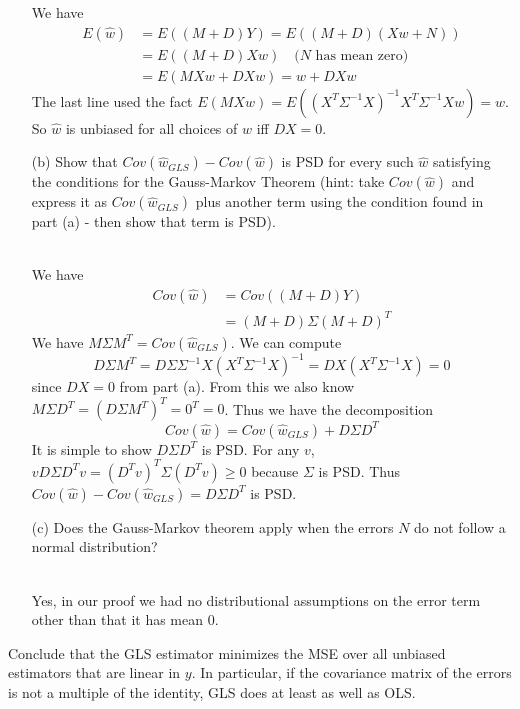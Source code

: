 \begin{Parts}
\begin{itemize}
	\begin{solution}
	We have 
	\begin{align*}
		E(\hat{w})&=E((M+D)Y)=E((M+D)(Xw+N))\\
		&=E((M+D)Xw)\quad\text{($N$ has mean zero)}\\
		&=E(MXw+DXw)=w+DXw
	\end{align*}
	The last line used the fact $E(MXw)=E((X^T\Sigma^{-1}X)^{-1}X^T\Sigma^{-1}Xw)=w$. So $\hat{w}$ is unbiased for all choices of $w$ iff $DX=0$.
	\end{solution}
	\item[(b)] Show that $Cov(\hat{w}_{GLS})-Cov(\hat{w})$ is PSD for every such $\hat{w}$ satisfying the conditions for the Gauss-Markov Theorem (hint: take $Cov(\hat{w})$ and express it as $Cov(\hat{w}_{GLS})$ plus another term using the condition found in part (a) - then show that term is PSD).\\
	\\
	\begin{solution}
	We have
	\begin{align*}
		Cov(\hat{w})&=Cov((M+D)Y)\\
		&=(M+D)\Sigma (M+D)^T
	\end{align*}
	We have $M\Sigma M^T=Cov(\hat{w}_{GLS})$. We can compute
	$$D\Sigma M^T = D\Sigma \Sigma^{-1}X(X^T\Sigma^{-1}X)^{-1}=DX(X^T\Sigma^{-1}X)=0$$ since $DX=0$ from part (a). From this we also know $M\Sigma D^T=(D\Sigma M^T)^T=0^T=0$. Thus we have the decomposition
	$$Cov(\hat{w})=Cov(\hat{w}_{GLS})+D\Sigma D^T$$
	It is simple to show $D\Sigma D^T$ is PSD. For any $v$, $vD\Sigma D^Tv=(D^Tv)^T\Sigma (D^Tv)\geq 0$ because $\Sigma$ is PSD. Thus $Cov(\hat{w})-Cov(\hat{w}_{GLS})=D\Sigma D^T$ is PSD.
	\end{solution}
	\item[(c)] Does the Gauss-Markov theorem apply when the errors $N$ do not follow a normal distribution?\\
	\\
	\begin{solution}
	Yes, in our proof we had no distributional assumptions on the error term other than that it has mean 0.
	\end{solution}
\end{itemize}
\Part Conclude that the GLS estimator minimizes the MSE over all unbiased estimators that are linear in $y$. In particular, if the covariance matrix of the errors is not a multiple of the identity, GLS does at least as well as OLS.\\

\end{Parts}
